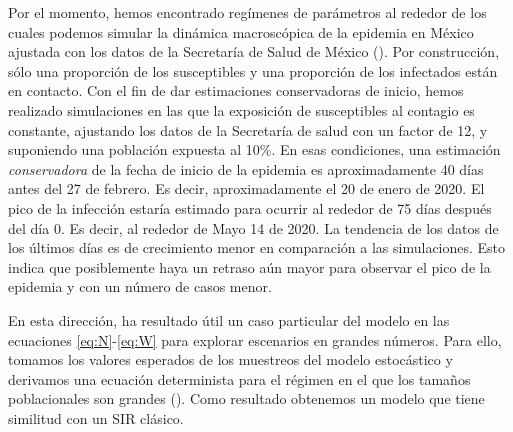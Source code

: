  Por el momento, hemos encontrado regímenes de parámetros al rededor de los cuales podemos simular la dinámica macroscópica de la epidemia en México ajustada con los datos de la Secretaría de Salud de México (). Por construcción, sólo una proporción de los susceptibles y una proporción de los infectados están en contacto. Con el fin de dar estimaciones conservadoras de inicio, hemos realizado simulaciones en las que la exposición de susceptibles al contagio es constante, ajustando los datos de la Secretaría de salud  con un factor de 12, y  suponiendo una  población expuesta al 10\%. En esas condiciones, una estimación \textit{conservadora} de la fecha de inicio de la epidemia es aproximadamente 40 días antes del 27 de febrero. Es decir, aproximadamente el 20 de enero de 2020. El pico de la infección estaría estimado para ocurrir al rededor de 75 días después del día 0. Es decir, al rededor de Mayo 14 de 2020. La tendencia de los datos de los últimos días es de crecimiento menor en comparación a las simulaciones. Esto indica que posiblemente haya un retraso aún mayor para observar el pico de la epidemia y con un número de casos menor.

En esta dirección, ha resultado útil un caso particular del modelo en las ecuaciones \eqref{eq:N}-\eqref{eq:W}  para explorar escenarios en grandes números.
 Para ello, tomamos los valores esperados de los muestreos del modelo estocástico y derivamos una ecuación determinista para el régimen en el que los tamaños poblacionales son grandes (). Como resultado obtenemos un modelo que tiene similitud con un SIR clásico.

